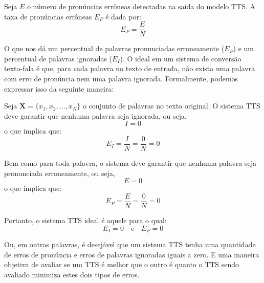 \documentclass{article}
\begin{document}
Seja \( E \) o número de pronúncias errôneas detectadas na saída do modelo TTS. A taxa de pronúncias errôneas \( E_P \) é dada por:
\begin{equation}
E_P = \frac{E}{N}
\end{equation}

O que nos dá um percentual de palavras pronunciadas erroneamente (\( E_P \)) e um percentual de palavras ignoradas (\( E_I \)). O ideal em um sistema de conversão texto-fala é que, para cada palavra no texto de entrada, não exista uma palavra com erro de pronúncia nem uma palavra ignorada. Formalmente, podemos expressar isso da seguinte maneira:

Seja \( \mathbf{X} = \{x_1, x_2, \ldots, x_N\} \) o conjunto de palavras no texto original. O sistema TTS deve garantir que nenhuma palavra seja ignorada, ou seja,
\begin{equation}
I = 0
\end{equation}
o que implica que:
\begin{equation}
E_I = \frac{I}{N} = \frac{0}{N} = 0
\end{equation}

Bem como para toda palavra, o sistema deve garantir que nenhuma palavra seja pronunciada erroneamente, ou seja,
\begin{equation}
E = 0
\end{equation}
o que implica que:
\begin{equation}
E_P = \frac{E}{N} = \frac{0}{N} = 0
\end{equation}

Portanto, o sistema TTS ideal é aquele para o qual:
\begin{equation}
E_I = 0 \quad \text{e} \quad E_P = 0
\end{equation}

Ou, em outras palavras, é desejável que um sistema TTS tenha uma quantidade de erros de pronúncia e erros de palavras ignoradas iguais a zero. E uma maneira objetiva de avaliar se um TTS é melhor que o outro é quanto o TTS sendo avaliado minimiza estes dois tipos de erros.
\end{document}
